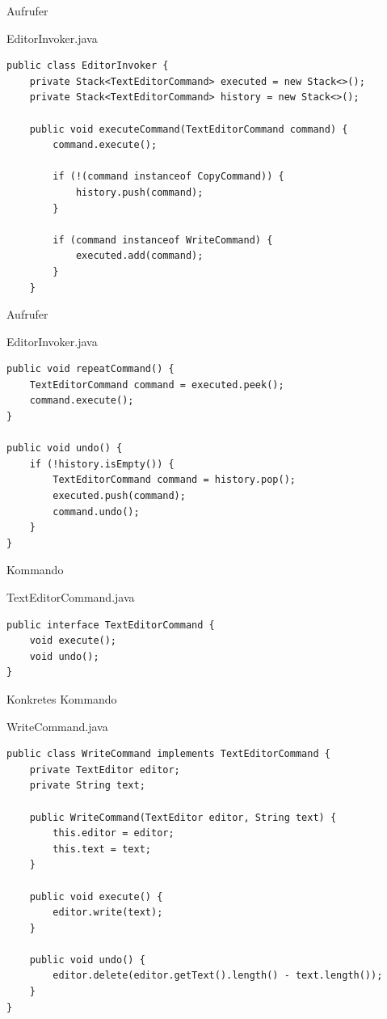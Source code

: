\begin{frame}[fragile]{Aufrufer}
	\begin{exampleblock}{EditorInvoker.java}
 		\begin{lstlisting}
public class EditorInvoker {
	private Stack<TextEditorCommand> executed = new Stack<>();
    private Stack<TextEditorCommand> history = new Stack<>();

    public void executeCommand(TextEditorCommand command) {
        command.execute();
        
        if (!(command instanceof CopyCommand)) { 
            history.push(command);
        }
        
        if (command instanceof WriteCommand) {
        	executed.add(command);
        }
    }
 		\end{lstlisting}
 	\end{exampleblock}
\end{frame}

\begin{frame}[fragile]{Aufrufer}
	\begin{exampleblock}{EditorInvoker.java}
 		\begin{lstlisting}
public void repeatCommand() {
    TextEditorCommand command = executed.peek();
    command.execute();
}

public void undo() {
    if (!history.isEmpty()) {
        TextEditorCommand command = history.pop();
        executed.push(command);
        command.undo();
    }
}
 		\end{lstlisting}
 	\end{exampleblock}
\end{frame}

\begin{frame}[fragile]{Kommando}
	\begin{exampleblock}{TextEditorCommand.java}
 		\begin{lstlisting}
public interface TextEditorCommand {
    void execute();
    void undo();
}
 		\end{lstlisting}
 	\end{exampleblock}
\end{frame}

\begin{frame}[fragile]{Konkretes Kommando}
	\begin{exampleblock}{WriteCommand.java}
 		\begin{lstlisting}
public class WriteCommand implements TextEditorCommand {
    private TextEditor editor;
    private String text;

    public WriteCommand(TextEditor editor, String text) {
        this.editor = editor;
        this.text = text;
    }

    public void execute() {
        editor.write(text);
    }

    public void undo() {
        editor.delete(editor.getText().length() - text.length());
    }
}
 		\end{lstlisting}
 	\end{exampleblock}
\end{frame}

